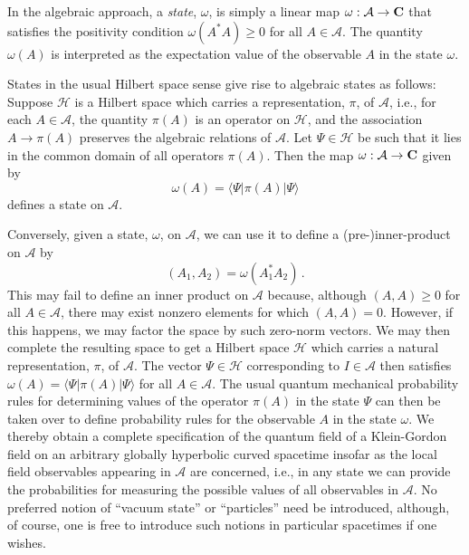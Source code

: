 \documentclass[12pt,epsf,amsfonts,amssymb]{article}
\begin{document}
In the algebraic approach, a {\it state}, $\omega$, is simply a linear
map $\omega: {\mathcal A} \rightarrow {\bf C}$ that satisfies the
positivity condition $\omega (A^* A) \geq 0$ for all $A \in {\mathcal
A}$. The quantity $\omega(A)$ is interpreted as the expectation value
of the observable $A$ in the state $\omega$. 

States in the usual Hilbert space sense give rise to algebraic states
as follows: Suppose $\mathcal H$ is a Hilbert space which carries a
representation, $\pi$, of $\mathcal A$, i.e., for each $A \in
{\mathcal A}$, the quantity $\pi (A)$ is an operator on $\mathcal H$,
and the association $A \rightarrow \pi(A)$ preserves the algebraic
relations of $\mathcal A$. Let $\Psi \in {\mathcal H}$ be such that it
lies in the common domain of all operators $\pi (A)$. Then the map
$\omega: {\mathcal A} \rightarrow {\bf C}$ given by
\begin{equation}
\omega(A) = \langle \Psi | \pi (A) | \Psi \rangle
\end{equation}
defines a state on $\mathcal A$.

Conversely, given a state, $\omega$, on $\mathcal A$, we can use it to
define a (pre-)inner-product on $\mathcal A$ by
\begin{equation}
(A_1, A_2) = \omega(A_1^* A_2) \, .
\end{equation}
This may fail to define an inner product on $\mathcal A$ because,
although $(A,A) \geq 0$ for all $A \in {\mathcal A}$, there may exist
nonzero elements for which $(A,A) = 0$. However, if this happens, we
may factor the space by such zero-norm vectors. We may then complete
the resulting space to get a Hilbert space $\mathcal H$ which carries
a natural representation, $\pi$, of $\mathcal A$. The vector $\Psi \in
{\mathcal H}$ corresponding to $I \in {\mathcal A}$ then satisfies
$\omega(A) = \langle \Psi | \pi (A) | \Psi \rangle$ for all $A \in
{\mathcal A}$. The usual quantum mechanical probability rules for
determining values of the operator $\pi(A)$ in the state $\Psi$ can
then be taken over to define probability rules for the observable $A$
in the state $\omega$. We thereby obtain a complete specification of
the quantum field of a Klein-Gordon field on an arbitrary globally
hyperbolic curved spacetime insofar as the local field observables
appearing in $\mathcal A$ are concerned, i.e., in any state we can
provide the probabilities for measuring the possible values of all
observables in $\mathcal A$. No preferred notion of ``vacuum state''
or ``particles'' need be introduced, although, of course, one is free
to introduce such notions in particular spacetimes if one wishes.
\end{document}

